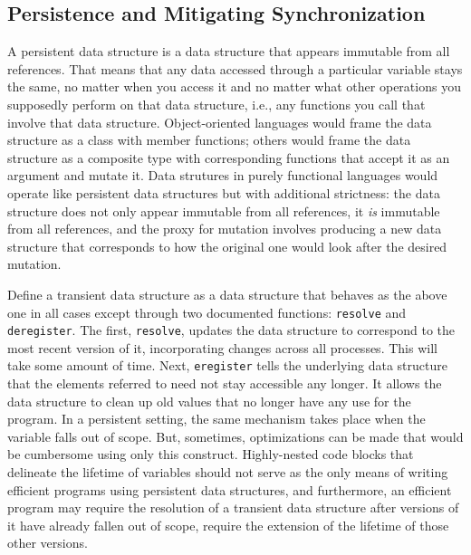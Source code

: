 \subsection{Persistence and Mitigating Synchronization}
A persistent data structure is a data structure that appears immutable from all
references. That means that any data accessed through a particular variable
stays the same, no matter when you access it and no matter what other
operations you supposedly perform on that data structure, i.e., any functions
you call that involve that data structure. Object-oriented languages would frame
the data structure as a class with member functions; others would frame the data
structure as a composite type with corresponding functions that accept it as
an argument and mutate it. Data strutures in purely functional languages would
operate like persistent data structures but with additional strictness: the data
structure does not only appear immutable from all references, it \textit{is}
immutable from all references, and the proxy for mutation involves producing a
new data structure that corresponds to how the original one would look after the
desired mutation.

Define a transient data structure as a data structure that behaves as the above
one in all cases except through two documented functions: \texttt{resolve} and
\texttt{deregister}. The first, \texttt{resolve}, updates the data structure to
correspond to the most recent version of it, incorporating changes across all
processes. This will take some amount of time. Next,
\texttt{eregister} tells the underlying data structure that the elements
referred to need not stay accessible any longer. It allows the data structure to
clean up old values that no longer have any use for the program. In a persistent
setting, the same mechanism takes place when the variable falls out of scope.
But, sometimes, optimizations can be made that would be cumbersome using only
this construct. Highly-nested code blocks that delineate the lifetime of
variables should not serve as the only means of writing efficient programs using
persistent data structures, and furthermore, an efficient program may require
the resolution of a transient data structure after versions of it have already
fallen out of scope, require the extension of the lifetime of those other
versions.

\newcommand{\toper}{t_\mathrm{oper}}
\newcommand{\tcomm}{t_\mathrm{comm}}
\newcommand{\tpar}{t_\mathrm{par}}
\newcommand{\tser}{t_\mathrm{ser}}

